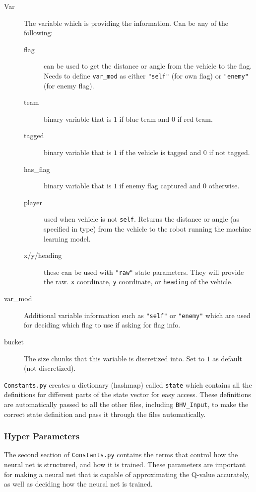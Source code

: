 \documentclass[onecolumn,letterpaper,11pt]{article}
\begin{document}
\begin{description}
	\item[Var] The variable which is providing the information. Can be any of the following:
	\begin{description}
		\item[flag] can be used to get the distance or angle from the vehicle to the flag. Needs to define \texttt{var\_mod} as either \texttt{"self"} (for own flag) or \texttt{"enemy"} (for enemy flag).
		\item[team] binary variable that is $1$ if blue team and $0$ if red team. 
		\item[tagged] binary variable that is $1$ if the vehicle is tagged and $0$ if not tagged.
		\item[has\_flag] binary variable that is $1$ if enemy flag captured and $0$ otherwise.
		\item[player] used when vehicle is not \texttt{self}. Returns the distance or angle (as specified in type) from the vehicle to the robot running the machine learning model.
		\item[x/y/heading] these can be used with \texttt{"raw"} state parameters. They will provide the raw. \texttt{x} coordinate, \texttt{y} coordinate, or \texttt{heading} of the vehicle. 
	\end{description}
	\item[var\_mod] Additional variable information such as \texttt{"self"} or \texttt{"enemy"} which are used for deciding which flag to use if asking for flag info. 
	\item[bucket] The size chunks that this variable is discretized into. Set to $1$ as default (not discretized).
	
\end{description}
\texttt{Constants.py} creates a dictionary (hashmap) called \texttt{state} which contains all the definitions for different parts of the state vector for easy access. These definitions are automatically passed to all the other files, including \texttt{BHV\_Input}, to make the correct state definition and pass it through the files automatically. 

\subsubsection{Hyper Parameters}
The second section of \texttt{Constants.py} contains the terms that control how the neural net is structured, and how it is trained. These parameters are important for making a neural net that is capable of approximating the Q-value accurately, as well as deciding how the neural net is trained.
\end{document}

